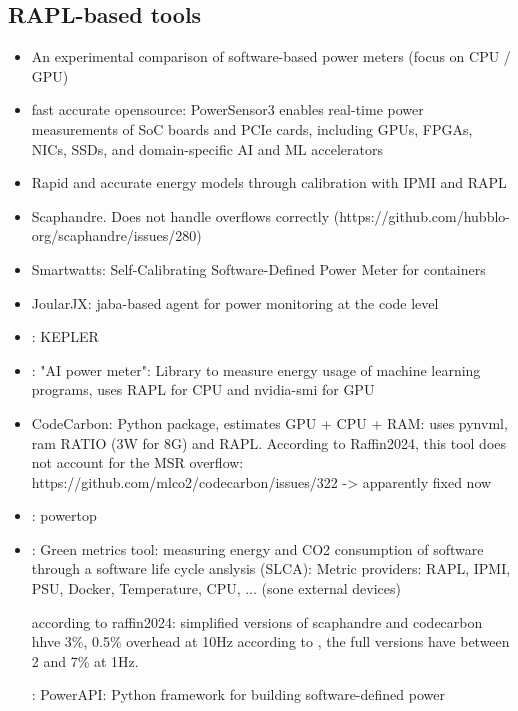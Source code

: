 \subsection{RAPL-based tools}
\label{sec:rapltools}
\begin{itemize}
    \item \parencite{jay2023experimental} An experimental comparison of software-based power meters (focus on CPU / GPU)
    \item \parencite{van2025powersensor3} fast accurate opensource: PowerSensor3 enables real-time power measurements of SoC boards and PCIe cards, including GPUs, FPGAs, NICs, SSDs, and domain-specific AI and ML accelerators
    \item \parencite{kavanagh2019rapid} Rapid and accurate energy models through calibration with IPMI and RAPL
    \item \parencite{scaphandre_documentation} Scaphandre. Does not handle overflows correctly (https://github.com/hubblo-org/scaphandre/issues/280)
    \item \parencite{fieni2020smartwatts} Smartwatts: Self-Calibrating Software-Defined Power Meter for containers
    \item \parencite{joularjx} JoularJX: jaba-based agent for power monitoring at the code level
    \item \parencite{kepler_energy}: KEPLER
    \item \parencite{aipowermeter}: "AI power meter": Library to measure energy usage of machine learning programs, uses RAPL for CPU and nvidia-smi for GPU
    \item \parencite{codecarbon} CodeCarbon: Python package, estimates GPU + CPU + RAM: uses pynvml, ram RATIO (3W for 8G) and RAPL. According to Raffin2024, this tool does not account for the MSR overflow: https://github.com/mlco2/codecarbon/issues/322 -> apparently fixed now
    \item \parencite{powertop}: powertop
    \item \parencite{greencodingdocs}: Green metrics tool: measuring energy and CO2 consumption of software through a software life cycle anslysis (SLCA): Metric providers: RAPL, IPMI, PSU, Docker, Temperature, CPU, ... (sone external devices)
    
    according to raffin2024: simplified versions of scaphandre and codecarbon hhve 3\%, 0.5\% overhead at 10Hz
    according to \parencite{jay2023experimental}, the full versions have between 2 and 7\% at 1Hz.

\parencite{fieni2024powerapi}: PowerAPI: Python framework for building software-defined power
\end{itemize}
\begin{comment}
- multiple papers have tried to attribute component-level 
\end{comment}



